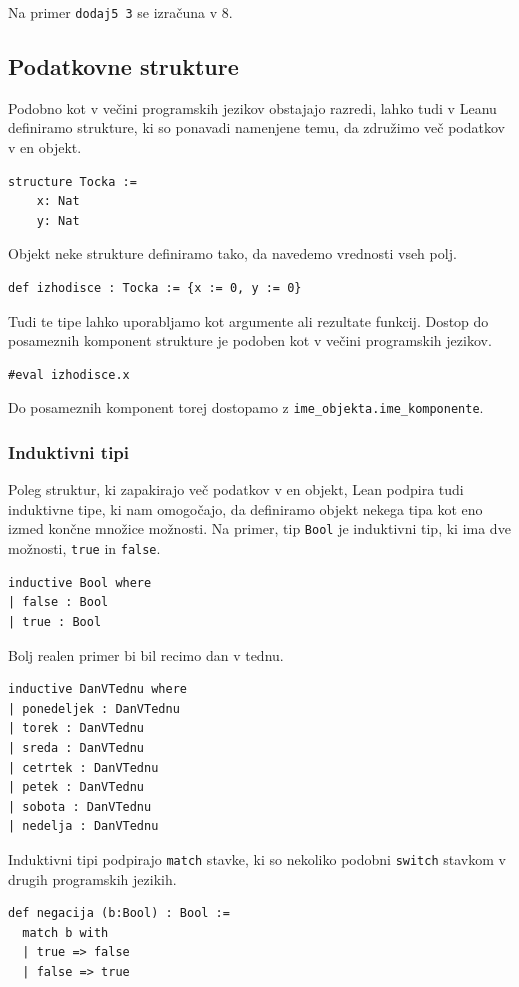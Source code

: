 \documentclass[mat1]{fmfdelo}
\begin{document}
Na primer \lstinline{dodaj5 3} se izračuna v 8.


\subsection{Podatkovne strukture}

Podobno kot v večini programskih jezikov obstajajo razredi, lahko tudi v Leanu definiramo strukture, ki so ponavadi namenjene temu,
da združimo več podatkov v en objekt.
\begin{lstlisting}
structure Tocka :=
    x: Nat
    y: Nat
\end{lstlisting}
Objekt neke strukture definiramo tako, da navedemo vrednosti vseh polj.
\begin{lstlisting}
def izhodisce : Tocka := {x := 0, y := 0}
\end{lstlisting}
Tudi te tipe lahko uporabljamo kot argumente ali rezultate funkcij.
Dostop do posameznih komponent strukture je podoben kot v večini programskih jezikov.
\begin{lstlisting}
#eval izhodisce.x
\end{lstlisting}
Do posameznih komponent torej dostopamo z \lstinline{ime_objekta.ime_komponente}.

\subsubsection{Induktivni tipi}
Poleg struktur, ki zapakirajo več podatkov v en objekt, Lean podpira tudi induktivne tipe, ki nam omogočajo, da definiramo objekt nekega tipa
kot eno izmed končne množice možnosti. Na primer, tip \lstinline{Bool} je induktivni tip, ki ima dve možnosti, \lstinline{true} in \lstinline{false}.
\begin{lstlisting}
inductive Bool where
| false : Bool
| true : Bool
\end{lstlisting}

Bolj realen primer bi bil recimo dan v tednu.
\begin{lstlisting}
inductive DanVTednu where
| ponedeljek : DanVTednu
| torek : DanVTednu
| sreda : DanVTednu
| cetrtek : DanVTednu
| petek : DanVTednu
| sobota : DanVTednu
| nedelja : DanVTednu
\end{lstlisting}

Induktivni tipi podpirajo \lstinline{match} stavke, ki so nekoliko podobni \lstinline{switch} stavkom v drugih programskih jezikih.

\begin{lstlisting}
def negacija (b:Bool) : Bool :=
  match b with
  | true => false
  | false => true
\end{lstlisting}
\end{document}
